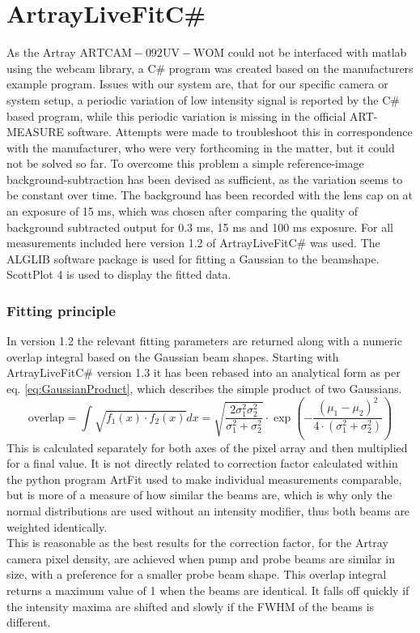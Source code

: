 \documentclass[twoside,openright,listof=numbered]{scrreprt}
\begin{document}
\section{ArtrayLiveFitC\#}\label{sec:LiveFitting}
As the Artray $\mathrm{ARTCAM-092UV-WOM}$ could not be interfaced with matlab using the webcam library, a C\# program was created based on the manufacturers example program.\cite{Artray2018}
Issues with our system are, that for our specific camera or system setup, a periodic variation of low intensity signal is reported by the C\# based program, while this periodic variation is missing in the official ART-MEASURE software. Attempts were made to troubleshoot this in correspondence with the manufacturer, who were very forthcoming in the matter, but it could not be solved so far. To overcome this problem a simple reference-image background-subtraction has been devised as sufficient, as the variation seems to be constant over time. The background has been recorded with the lens cap on at an exposure of 15 ms, which was chosen after comparing the quality of background subtracted output for 0.3 ms, 15 ms and 100 ms exposure. 
\newline
For all measurements included here version 1.2 of ArtrayLiveFitC\# was used. The ALGLIB\cite{Bochkanov2024} software package is used for fitting a Gaussian to the beamshape. ScottPlot 4\cite{ScottPlot4} is used to display the fitted data.\\
\subsubsection{Fitting principle}
In version 1.2 the relevant fitting parameters are returned along with a numeric overlap integral based on the Gaussian beam shapes. Starting with ArtrayLiveFitC\# version 1.3 it has been rebased into an analytical form as per eq. \ref{eq:GaussianProduct}, which describes the simple product of two Gaussians.
\begin{equation}
\mathrm{overlap} = \int \sqrt{f_1(x)\cdot f_2(x)}dx =  \sqrt{\frac{2 \sigma_1^2\sigma_2^2}{\sigma_1^2+\sigma_2^2}}\cdot \exp\left(-\frac{\left(\mu_1-\mu_2\right)^2}{4\cdot \left(\sigma_1^2 + \sigma_2^2\right)}\right)\label{eq:GaussianProduct}
\end{equation}
This is calculated separately for both axes of the pixel array and then multiplied for a final value. 
It is not directly related to correction factor calculated within the python program ArtFit used to make individual measurements comparable, but is more of a measure of how similar the beams are, which is why only the normal distributions are used without an intensity modifier, thus both beams are weighted identically. \\
This is reasonable as the best results for the correction factor, for the Artray camera pixel density, are achieved when pump and probe beams are similar in size, with a preference for a smaller probe beam shape. This overlap integral returns a maximum value of 1 when the beams are identical. It falls off quickly if the intensity maxima are shifted and slowly if the FWHM of the beams is different.\\
\end{document}
